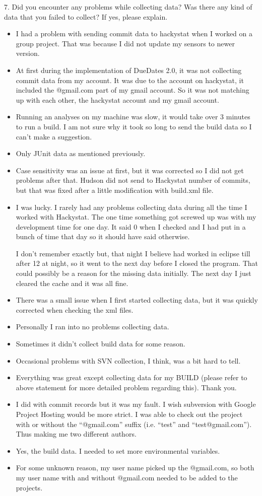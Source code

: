 \documentclass[11pt]{article}
\begin{document}
7. Did you encounter any problems while collecting data? Was 
there any kind of data that you failed to collect? If yes, 
please explain. 
\begin{itemize}
\item I had a problem with sending commit data to hackystat when I worked on a group project. That was because I did not update my sensors to newer version. 
\item At first during the implementation of DueDates 2.0, it was not collecting commit data from my account. It was due to the account on hackystat, it included the @gmail.com part of my gmail account. So it was not matching up with each other, the hackystat account and my gmail account.
\item Running an analyses on my machine was slow, it would take over 3 minutes to run a build.  I am not sure why it took so long to send the build data so I can't make a suggestion.
\item Only JUnit data as mentioned previously.
\item Case sensitivity was an issue at first, but it was corrected so I did not get problems after that.  Hudson did not send to Hackystat number of commits, but that was fixed after a little modification with build.xml file.   
\item I was lucky. I rarely had any problems collecting data during all the time I worked with Hackystat. The one time something got screwed up was with my development time for one day. It said 0 when I checked and I had put in a bunch of time that day so it should have said otherwise. 

I don't remember exactly but, that night I believe had worked in eclipse till after 12 at night, so it went to the next day before I closed the program. That could possibly be a reason for the missing data initially. The next day I just cleared the cache and it was all fine.
\item There was a small issue when I first started collecting data, but it was quickly corrected when checking the xml files.
\item Personally I ran into no problems collecting data.
\item Sometimes it didn't collect build data for some reason.
\item Occasional problems with SVN collection, I think, was a bit hard to tell.
\item Everything was great except collecting data for my BUILD (please refer to above statement for more detailed problem regarding this). Thank you.
\item I did with commit records but it was my fault.  I wish subversion with Google Project Hosting would be more strict.  I was able to check out the project with or without the ``@gmail.com'' suffix (i.e. ``test'' and ``test@gmail.com'').  Thus making me two different authors.
\item Yes, the build data.  I needed to set more environmental variables. 
\item For some unknown reason, my user name picked up the @gmail.com, so both my user name with and without @gmail.com needed to be added to the projects.
\end{itemize}
\end{document}
